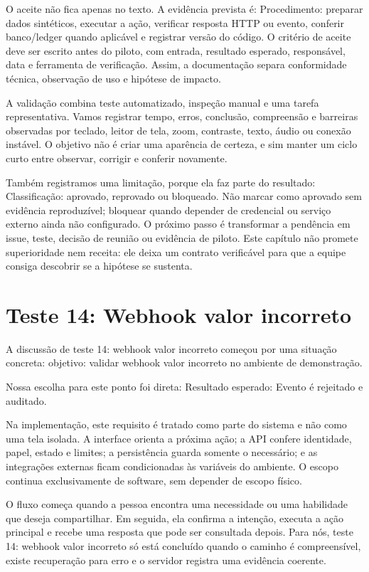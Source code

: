 \documentclass[12pt,oneside,a4paper,article]{abntex2}
\begin{document}
O aceite não fica apenas no texto. A evidência prevista é: Procedimento: preparar dados sintéticos, executar a ação, verificar resposta HTTP ou evento, conferir banco/ledger quando aplicável e registrar versão do código. O critério de aceite deve ser escrito antes do piloto, com entrada, resultado esperado, responsável, data e ferramenta de verificação. Assim, a documentação separa conformidade técnica, observação de uso e hipótese de impacto.

A validação combina teste automatizado, inspeção manual e uma tarefa representativa. Vamos registrar tempo, erros, conclusão, compreensão e barreiras observadas por teclado, leitor de tela, zoom, contraste, texto, áudio ou conexão instável. O objetivo não é criar uma aparência de certeza, e sim manter um ciclo curto entre observar, corrigir e conferir novamente.

Também registramos uma limitação, porque ela faz parte do resultado: Classificação: aprovado, reprovado ou bloqueado. Não marcar como aprovado sem evidência reproduzível; bloquear quando depender de credencial ou serviço externo ainda não configurado. O próximo passo é transformar a pendência em issue, teste, decisão de reunião ou evidência de piloto. Este capítulo não promete superioridade nem receita: ele deixa um contrato verificável para que a equipe consiga descobrir se a hipótese se sustenta.

\section{Teste 14: Webhook valor incorreto}
A discussão de teste 14: webhook valor incorreto começou por uma situação concreta: objetivo: validar webhook valor incorreto no ambiente de demonstração.

Nossa escolha para este ponto foi direta: Resultado esperado: Evento é rejeitado e auditado.

Na implementação, este requisito é tratado como parte do sistema e não como uma tela isolada. A interface orienta a próxima ação; a API confere identidade, papel, estado e limites; a persistência guarda somente o necessário; e as integrações externas ficam condicionadas às variáveis do ambiente. O escopo continua exclusivamente de software, sem depender de escopo físico.

O fluxo começa quando a pessoa encontra uma necessidade ou uma habilidade que deseja compartilhar. Em seguida, ela confirma a intenção, executa a ação principal e recebe uma resposta que pode ser consultada depois. Para nós, teste 14: webhook valor incorreto só está concluído quando o caminho é compreensível, existe recuperação para erro e o servidor registra uma evidência coerente.
\end{document}
